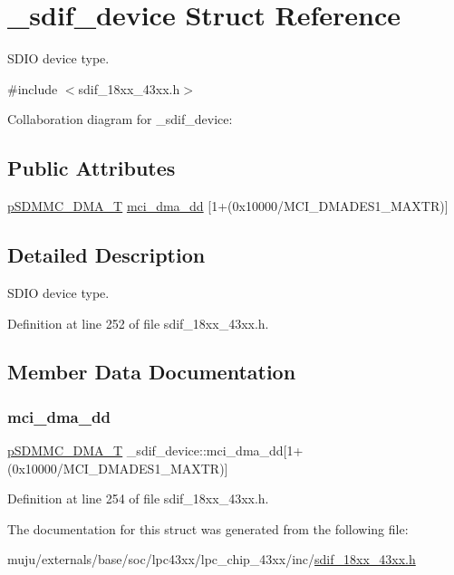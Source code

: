 \hypertarget{struct__sdif__device}{}\section{\+\_\+sdif\+\_\+device Struct Reference}
\label{struct__sdif__device}


S\+D\+IO device type.  




{\ttfamily \#include $<$sdif\+\_\+18xx\+\_\+43xx.\+h$>$}



Collaboration diagram for \+\_\+sdif\+\_\+device\+:
\subsection*{Public Attributes}
\begin{DoxyCompactItemize}
\item 
\hyperlink{structp_s_d_m_m_c___d_m_a___t}{p\+S\+D\+M\+M\+C\+\_\+\+D\+M\+A\+\_\+T} \hyperlink{struct__sdif__device_aa1e9776a0f28f3e6d48f210223b675cb}{mci\+\_\+dma\+\_\+dd} \mbox{[}1+(0x10000/\+M\+C\+I\+\_\+\+D\+M\+A\+D\+E\+S1\+\_\+\+M\+A\+X\+T\+R)\mbox{]}
\end{DoxyCompactItemize}


\subsection{Detailed Description}
S\+D\+IO device type. 

Definition at line 252 of file sdif\+\_\+18xx\+\_\+43xx.\+h.



\subsection{Member Data Documentation}
\mbox{\label{struct__sdif__device_aa1e9776a0f28f3e6d48f210223b675cb}} 
\subsubsection{\texorpdfstring{mci\+\_\+dma\+\_\+dd}{mci\_dma\_dd}}
{\footnotesize\ttfamily \hyperlink{structp_s_d_m_m_c___d_m_a___t}{p\+S\+D\+M\+M\+C\+\_\+\+D\+M\+A\+\_\+T} \+\_\+sdif\+\_\+device\+::mci\+\_\+dma\+\_\+dd\mbox{[}1+(0x10000/\+M\+C\+I\+\_\+\+D\+M\+A\+D\+E\+S1\+\_\+\+M\+A\+X\+T\+R)\mbox{]}}



Definition at line 254 of file sdif\+\_\+18xx\+\_\+43xx.\+h.



The documentation for this struct was generated from the following file\+:\begin{DoxyCompactItemize}
\item 
muju/externals/base/soc/lpc43xx/lpc\+\_\+chip\+\_\+43xx/inc/\hyperlink{sdif__18xx__43xx_8h}{sdif\+\_\+18xx\+\_\+43xx.\+h}\end{DoxyCompactItemize}
